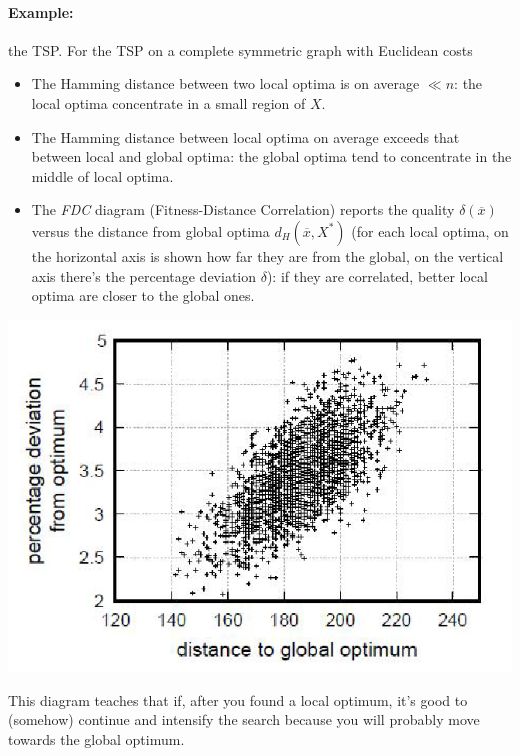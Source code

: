 \paragraph{Example:} the TSP. For the TSP on a complete symmetric graph with Euclidean costs
\begin{itemize}
	\item The Hamming distance between two local optima is on average $\ll n$: the local optima concentrate in a small region of $X$.\\
	
	\item The Hamming distance between local optima on average exceeds that between local and global optima: the global optima tend to concentrate in the middle of local optima.\\
	
	\item The \textit{FDC} diagram (Fitness-Distance Correlation) reports the quality $\delta (\overline{x})$ versus the distance from global optima $d_H (\overline{x}, X^\ast)$ (for each local optima, on the horizontal axis is shown how far they are from the global, on the vertical axis there's the percentage deviation $\delta$): if they are correlated, better local optima are closer to the global ones.\\
\end{itemize}
\begin{center}
	\includegraphics[width=0.7\columnwidth]{img/TSP3}
\end{center}

This diagram teaches that if, after you found a local optimum, it's good to (somehow) continue and intensify the search because you will probably move towards the global optimum.\\

\newpage

